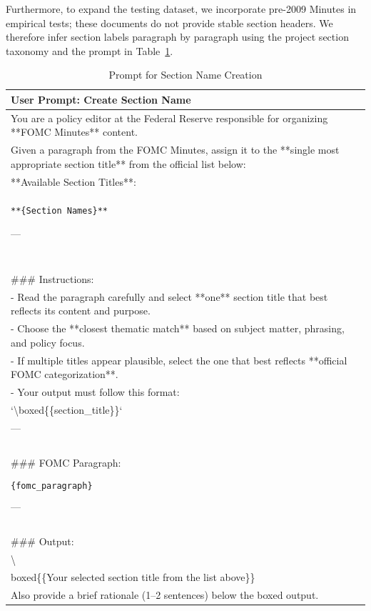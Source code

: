 Furthermore, to expand the testing dataset, we incorporate pre-2009 Minutes in
empirical tests; these documents do not provide stable section headers. We
therefore infer section labels paragraph by paragraph using the project section
taxonomy and the prompt in Table~\ref{tab:ch2:section_name_prompt}.


\begin{table}[htbp]
\centering
\footnotesize
\begin{tabular}{p{}}
\toprule
\textbf{User Prompt: Create Section Name} \\
\hline
You are a policy editor at the Federal Reserve responsible for organizing **FOMC Minutes** content. \\

Given a paragraph from the FOMC Minutes, assign it to the **single most appropriate section title** from the official list below: \\

**Available Section Titles**: \\

\texttt{**\{Section Names\}**}

--- \\
~\\
\#\#\# Instructions: \\

- Read the paragraph carefully and select **one** section title that best reflects its content and purpose. \\
- Choose the **closest thematic match** based on subject matter, phrasing, and policy focus. \\
- If multiple titles appear plausible, select the one that best reflects **official FOMC categorization**.\\
- Your output must follow this format:   \\
  `\textbackslash boxed\{\{section\_title\}\}` \\

--- \\
~\\
\#\#\# FOMC Paragraph: \\
{Paragraph}\\
\texttt{\{fomc\_paragraph\}}  \\
{/Paragraph}\\

--- \\
~\\
\#\#\# Output: \\
\textbackslash \\boxed\{\{Your selected section title from the list above\}\} \\

Also provide a brief rationale (1--2 sentences) below the boxed output. \\

\bottomrule
\end{tabular}
\caption{Prompt for Section Name Creation}
\label{tab:ch2:section_name_prompt}
\end{table}


